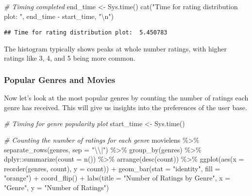 \documentclass[
]{article}
\newenvironment{Shaded}{}{}
\newcommand{\AttributeTok}[1]{\textcolor[rgb]{0.49,0.56,0.16}{#1}}
\newcommand{\CommentTok}[1]{\textcolor[rgb]{0.38,0.63,0.69}{\textit{#1}}}
\newcommand{\FunctionTok}[1]{\textcolor[rgb]{0.02,0.16,0.49}{#1}}
\newcommand{\NormalTok}[1]{#1}
\newcommand{\OtherTok}[1]{\textcolor[rgb]{0.00,0.44,0.13}{#1}}
\newcommand{\SpecialCharTok}[1]{\textcolor[rgb]{0.25,0.44,0.63}{#1}}
\newcommand{\StringTok}[1]{\textcolor[rgb]{0.25,0.44,0.63}{#1}}
\begin{document}
\begin{Shaded}
\begin{Highlighting}[]
\CommentTok{\# Timing completed}
\NormalTok{end\_time }\OtherTok{\textless{}{-}} \FunctionTok{Sys.time}\NormalTok{()}
\FunctionTok{cat}\NormalTok{(}\StringTok{"Time for rating distribution plot: "}\NormalTok{, end\_time }\SpecialCharTok{{-}}\NormalTok{ start\_time, }\StringTok{"}\SpecialCharTok{\textbackslash{}n}\StringTok{"}\NormalTok{)}
\end{Highlighting}
\end{Shaded}

\begin{verbatim}
## Time for rating distribution plot:  5.450783
\end{verbatim}

The histogram typically shows peaks at whole number ratings, with higher
ratings like 3, 4, and 5 being more common.

\subsubsection{Popular Genres and
Movies}\label{popular-genres-and-movies}

Now let's look at the most popular genres by counting the number of
ratings each genre has received. This will give us insights into the
preferences of the user base.

\begin{Shaded}
\begin{Highlighting}[]
\CommentTok{\# Timing for genre popularity plot}
\NormalTok{start\_time }\OtherTok{\textless{}{-}} \FunctionTok{Sys.time}\NormalTok{()}

\CommentTok{\# Counting the number of ratings for each genre}
\NormalTok{movielens }\SpecialCharTok{\%\textgreater{}\%}
  \FunctionTok{separate\_rows}\NormalTok{(genres, }\AttributeTok{sep =} \StringTok{"}\SpecialCharTok{\textbackslash{}\textbackslash{}}\StringTok{|"}\NormalTok{) }\SpecialCharTok{\%\textgreater{}\%}
  \FunctionTok{group\_by}\NormalTok{(genres) }\SpecialCharTok{\%\textgreater{}\%}
\NormalTok{  dplyr}\SpecialCharTok{::}\FunctionTok{summarize}\NormalTok{(}\AttributeTok{count =} \FunctionTok{n}\NormalTok{()) }\SpecialCharTok{\%\textgreater{}\%}
  \FunctionTok{arrange}\NormalTok{(}\FunctionTok{desc}\NormalTok{(count)) }\SpecialCharTok{\%\textgreater{}\%}
  \FunctionTok{ggplot}\NormalTok{(}\FunctionTok{aes}\NormalTok{(}\AttributeTok{x =} \FunctionTok{reorder}\NormalTok{(genres, count), }\AttributeTok{y =}\NormalTok{ count)) }\SpecialCharTok{+}
  \FunctionTok{geom\_bar}\NormalTok{(}\AttributeTok{stat =} \StringTok{"identity"}\NormalTok{, }\AttributeTok{fill =} \StringTok{"orange"}\NormalTok{) }\SpecialCharTok{+}
  \FunctionTok{coord\_flip}\NormalTok{() }\SpecialCharTok{+}
  \FunctionTok{labs}\NormalTok{(}\AttributeTok{title =} 
         \StringTok{"Number of Ratings by Genre"}\NormalTok{, }\AttributeTok{x =} \StringTok{"Genre"}\NormalTok{, }\AttributeTok{y =} \StringTok{"Number of Ratings"}\NormalTok{)}
\end{Highlighting}
\end{Shaded}
\end{document}
